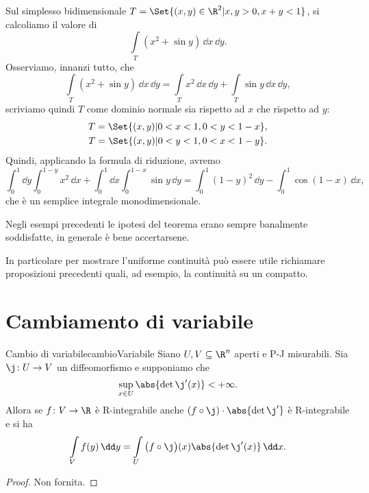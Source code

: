 \begin{ese}
	Sul simplesso bidimensionale \(T=\Set{(x,y)\in \R^2 | x,y>0, x+y<1}\), si calcoliamo il valore di
	\[
		\int\limits_T (x^2+\sin y)\,\dd x\,\dd y.
	\]
	Osserviamo, innanzi tutto, che
	\[
		\int\limits_T (x^2+\sin y)\,\dd x\,\dd y = \int\limits_T x^2\,\dd x\,\dd y + \int\limits_T \sin y\,\dd x\,\dd y,
	\]
	scriviamo quindi \(T\) come dominio normale sia rispetto ad \(x\) che rispetto ad \(y\):
	\begin{gather*}
		T = \Set{(x,y) | 0 < x < 1, 0 < y < 1-x},\\
		T = \Set{(x,y) | 0 < y < 1, 0 < x < 1-y}.
	\end{gather*}
	Quindi, applicando la formula di riduzione, avremo
	\[
		\int_0^1 \dd y\int_0^{1-y} x^2\,\dd x + \int_0^1 \dd x \int_0^{1-x} \sin y\,\dd y = \int_0^1 (1-y)^2\,\dd y - \int_0^1 \cos(1-x)\,\dd x,
	\]
	che è un semplice integrale monodimensionale.
\end{ese}

\begin{oss}
	Negli esempi precedenti le ipotesi del teorema erano sempre banalmente soddisfatte, in generale è bene accertarsene.

	In particolare per mostrare l'uniforme continuità può essere utile richiamare proposizioni precedenti quali, ad esempio, la continuità su un compatto.
\end{oss}
%
%
\section{Cambiamento di variabile}

\begin{teor}{Cambio di variabile}{cambioVariabile}
	Siano \(U,V\subseteq\R^n\) aperti e P-J misurabili.
	Sia \(\j\colon U\to V\) un diffeomorfismo e supponiamo che
	\[
		\sup_{x\in U}\abs{\det \j'(x)}<+\infty.
	\]
	Allora se \(f\colon V\to\R\) è R-integrabile anche \((f\circ \j)\cdot \abs{\det \j'}\) è R-integrabile e si ha
	\[
		\int\limits_V f(y)\,\dd y = \int\limits_U \big(f\circ \j\big)(x) \abs{\det\j'(x)}\,\dd x.
	\]
\end{teor}

\begin{proof}
	Non fornita.
\end{proof}

